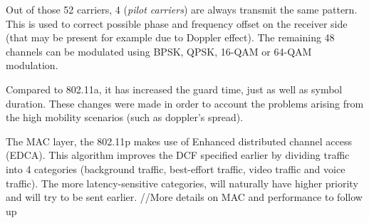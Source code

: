 Out of those 52 carriers, 4 (\emph{pilot carriers}) are always transmit the same pattern. This is used to correct possible phase and frequency offset on the receiver side (that may be present for example due to Doppler effect). The remaining 48 channels can be modulated using BPSK, QPSK, 16-QAM or 64-QAM modulation.\par
Compared to 802.11a, it has increased the guard time, just as well as symbol duration. These changes were made in order to account the problems arising from the high mobility scenarios (such as doppler's spread).\par
% 
% 
The MAC layer, the 802.11p makes use of Enhanced distributed channel access (EDCA). This algorithm improves the DCF specified earlier by dividing traffic into 4 categories (background traffic, best-effort traffic, video traffic and voice traffic). The more latency-sensitive categories, will naturally have higher priority and will try to be sent earlier.
//More details on MAC and performance to follow up